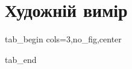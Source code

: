  
 
 
 
 
\section{Художній вимір}
\label{sec:topics.vojna.pics}



\ifcmt
  tab_begin cols=3,no_fig,center

  tab_end
\fi

